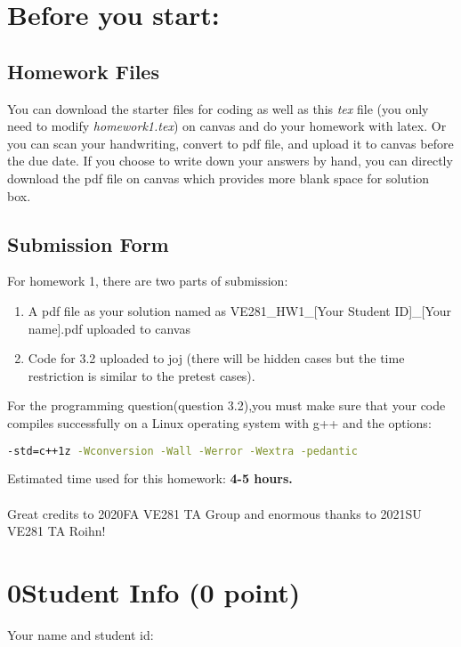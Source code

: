 \documentclass[11pt]{exam}
\begin{document}
\setlength{\parindent}{0pt}
\section*{Before you start:}

\subsection*{Homework Files}
You can download the starter files for coding as well as this \textit{tex} file (you only need to modify \textit{homework1.tex}) on canvas and do your homework with latex. Or you can scan your handwriting, convert to pdf file, and upload it to canvas before the due date. If you choose to write down your answers by hand, you can directly download the pdf file on canvas which provides more blank space for solution box.\\

\subsection*{Submission Form}
For homework 1, there are two parts of submission:
\begin{enumerate}
    \item A pdf file as your solution named as VE281\_HW1\_[Your Student ID]\_[Your name].pdf uploaded to canvas
    \item Code for 3.2 uploaded to joj (there will be hidden cases but the time restriction is similar to the pretest cases).
\end{enumerate}
For the programming question(question 3.2),you must make sure that your code compiles successfully on a Linux operating system with g++ and the options:
\begin{lstlisting}[language=bash]
-std=c++1z -Wconversion -Wall -Werror -Wextra -pedantic
\end{lstlisting}

Estimated time used for this homework: \textbf{4-5 hours.}
\\\\
Great credits to 2020FA VE281 TA Group and enormous thanks to 2021SU VE281 TA Roihn!

\newpage
\section*{0\quad Student Info (0 point)}
Your name and student id:
\begin{solution}
\end{solution}
\end{document}
